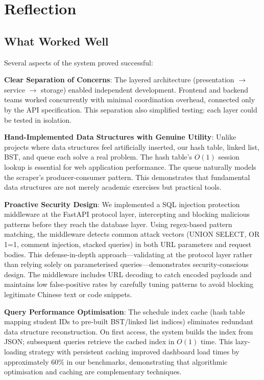 \documentclass[11pt,a4paper]{article}
\begin{document}
\section{Reflection}

\subsection{What Worked Well}
Several aspects of the system proved successful:

\textbf{Clear Separation of Concerns}: The layered architecture (presentation $\rightarrow$ service $\rightarrow$ storage) enabled independent development. Frontend and backend teams worked concurrently with minimal coordination overhead, connected only by the API specification. This separation also simplified testing: each layer could be tested in isolation.

\textbf{Hand-Implemented Data Structures with Genuine Utility}: Unlike projects where data structures feel artificially inserted, our hash table, linked list, BST, and queue each solve a real problem. The hash table's $O(1)$ session lookup is essential for web application performance. The queue naturally models the scraper's producer-consumer pattern. This demonstrates that fundamental data structures are not merely academic exercises but practical tools.

\textbf{Proactive Security Design}: We implemented a SQL injection protection middleware at the FastAPI protocol layer, intercepting and blocking malicious patterns before they reach the database layer. Using regex-based pattern matching, the middleware detects common attack vectors (UNION SELECT, OR 1=1, comment injection, stacked queries) in both URL parameters and request bodies. This defense-in-depth approach---validating at the protocol layer rather than relying solely on parameterised queries---demonstrates security-conscious design. The middleware includes URL decoding to catch encoded payloads and maintains low false-positive rates by carefully tuning patterns to avoid blocking legitimate Chinese text or code snippets.

\textbf{Query Performance Optimisation}: The schedule index cache (hash table mapping student IDs to pre-built BST/linked list indices) eliminates redundant data structure reconstruction. On first access, the system builds the index from JSON; subsequent queries retrieve the cached index in $O(1)$ time. This lazy-loading strategy with persistent caching improved dashboard load times by approximately 60\% in our benchmarks, demonstrating that algorithmic optimisation and caching are complementary techniques.
\end{document}
